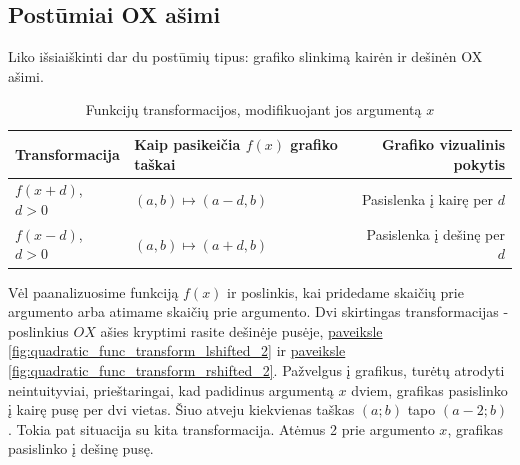 \documentclass[nobib]{tufte-handout}
\begin{document}
\subsection{Postūmiai OX ašimi}\label{sec:translation_OX_axis}

Liko išsiaiškinti dar du postūmių tipus: grafiko slinkimą kairėn ir dešinėn OX
ašimi.

\begin{table}[!htpb]
  \centering
  \begin{tabular}{
    l | %
    >{\raggedleft\arraybackslash}p{3cm} | %
    r	%
    }
    \toprule
    {Transformacija}  & {Kaip pasikeičia $f(x)$ grafiko taškai}
                      & {Grafiko vizualinis pokytis}            \\
    \midrule
    {$f(x+d)$, $d>0$} & {$(a,b)\mapsto(a-d, b)$}
                      & {Pasislenka į kairę per $d$}            \\
    {$f(x-d)$, $d>0$} & {$(a,b)\mapsto(a+d, b)$}
                      & {Pasislenka į dešinę per $d$}           \\
    \bottomrule
  \end{tabular}
  \vspace{16pt} %
  \caption{Funkcijų transformacijos, modifikuojant jos argumentą $x$}
  \label{tbl:after_transformations}
\end{table}

Vėl paanalizuosime funkciją $f(x)$ ir poslinkis, kai pridedame skaičių prie
argumento
arba atimame skaičių prie argumento. Dvi skirtingas transformacijas -
poslinkius $OX$ ašies kryptimi rasite dešinėje pusėje,
\hyperref[fig:quadratic_func_transform_lshifted_2]{paveiksle
  \ref*{fig:quadratic_func_transform_lshifted_2}} ir
\hyperref[fig:quadratic_func_transform_rshifted_2]{paveiksle
  \ref*{fig:quadratic_func_transform_rshifted_2}}. Pažvelgus į grafikus, turėtų
atrodyti neintuityviai, prieštaringai, kad padidinus argumentą $x$ dviem,
grafikas pasislinko į kairę pusę per dvi vietas. Šiuo atveju kiekvienas taškas
$(a;b)$ tapo $(a-2;b)$. Tokia pat situacija su kita transformacija. Atėmus 2
prie argumento $x$, grafikas pasislinko į dešinę pusę.
\end{document}
